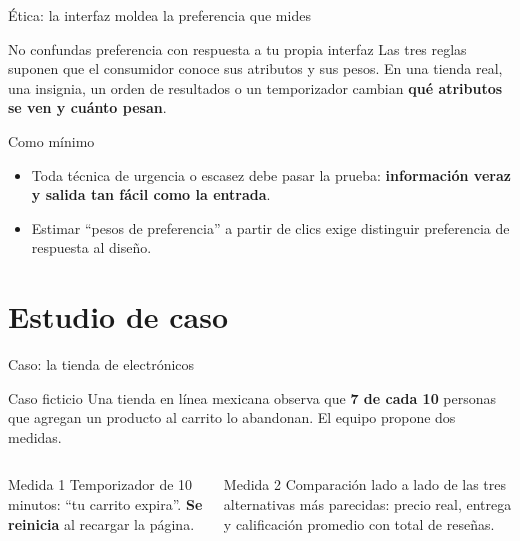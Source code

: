 \documentclass[aspectratio=169,xcolor=dvipsnames]{beamer}
\begin{document}
\begin{frame}{Ética: la interfaz moldea la preferencia que mides}
\begin{alertblock}{No confundas preferencia con respuesta a tu propia interfaz}
  Las tres reglas suponen que el consumidor conoce sus atributos y sus pesos. En una tienda real, una insignia, un orden de resultados o un temporizador cambian \textbf{qué atributos se ven y cuánto pesan}.
\end{alertblock}
\begin{block}{Como mínimo}
  \begin{itemize}
    \item Toda técnica de urgencia o escasez debe pasar la prueba: \textbf{información veraz y salida tan fácil como la entrada}.
    \item Estimar \enquote{pesos de preferencia} a partir de clics exige distinguir preferencia de respuesta al diseño.
  \end{itemize}
\end{block}
\end{frame}

\section[Caso]{Estudio de caso}

\begin{frame}{Caso: la tienda de electrónicos}
\begin{exampleblock}{Caso ficticio}
  Una tienda en línea mexicana observa que \textbf{7 de cada 10} personas que agregan un producto al carrito lo abandonan. El equipo propone dos medidas.
\end{exampleblock}
\begin{columns}[T]
  \begin{alertblock}{Medida 1}
    \small Temporizador de 10 minutos: \enquote{tu carrito expira}. \textbf{Se reinicia} al recargar la página.
  \end{alertblock}
  \begin{block}{Medida 2}
    \small Comparación lado a lado de las tres alternativas más parecidas: precio real, entrega y calificación promedio con total de reseñas.
  \end{block}
\end{columns}
\end{frame}
\end{document}
